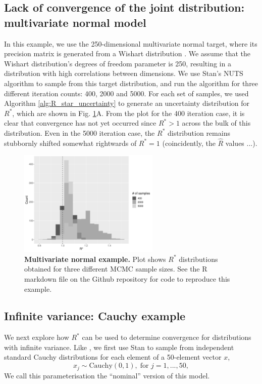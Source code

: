 \documentclass{article}
\begin{document}
\subsection{Lack of convergence of the joint distribution: multivariate normal model}\label{sec:multivariate_normal}
In this example, we use the 250-dimensional multivariate normal target, where its precision matrix is generated from a Wishart distribution \cite{hoffman2014no}. We assume that the Wishart distribution's degrees of freedom parameter is 250, resulting in a distribution with high correlations between dimensions. We use Stan's NUTS algorithm to sample from this target distribution, and run the algorithm for three different iteration counts: 400, 2000 and 5000. For each set of samples, we used Algorithm \ref{alg:R_star_uncertainty} to generate an uncertainty distribution for $R^*$, which are shown in Fig. \ref{fig:mvt}A. From the plot for the 400 iteration case, it is clear that convergence has not yet occurred since $R^*>1$ across the bulk of this distribution. Even in the 5000 iteration case, the $R^*$ distribution remains stubbornly shifted somewhat rightwards of $R^*=1$ (coincidently, the $\hat{R}$ values ...).  

\begin{figure}[h]
	\centerline{\includegraphics[width=0.6\textwidth]{../output/mvt_three.pdf}}
	\caption{\textbf{Multivariate normal example.} Plot shows $R^*$ distributions obtained for three different MCMC sample sizes. See the R markdown file on the Github repository for code to reproduce this example.}
	\label{fig:mvt}
\end{figure}

\subsection{Infinite variance: Cauchy example}
We next explore how $R^*$ can be used to determine convergence for distributions with infinite variance. Like \cite{vehtari2019rank}, we first use Stan to sample from independent standard Cauchy distributions for each element of a 50-element vector $x$,
%
\begin{equation}
x_j\sim \text{Cauchy}(0, 1),\; \text{for } j=1,...,50,
\end{equation}
%
We call this parameterisation the ``nominal'' version of this model.
\end{document}
